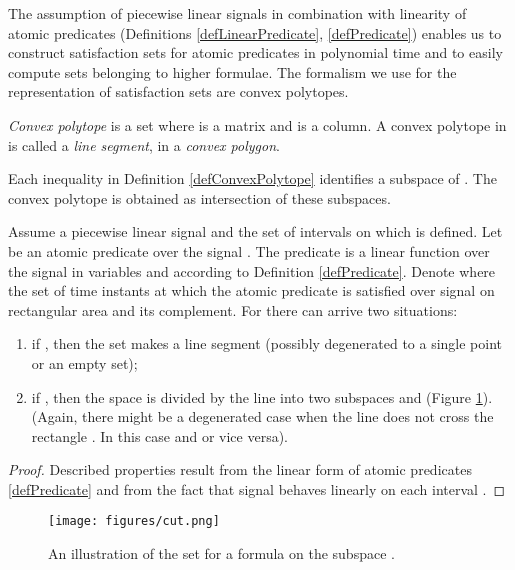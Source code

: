 The assumption of piecewise linear signals in combination with linearity of atomic predicates (Definitions \ref{defLinearPredicate}, \ref{defPredicate}) enables us to construct satisfaction sets for atomic predicates in polynomial time and to easily compute sets belonging to higher formulae. The formalism we use for the representation of satisfaction sets are convex polytopes.

\begin{definition}
	\label{defConvexPolytope}
	\emph{Convex polytope}  is a set  where  is a matrix and  is a  column. A convex polytope in  is called a \emph{line segment}, in  a \emph{convex polygon}.
\end{definition}

Each inequality  in Definition \ref{defConvexPolytope} identifies a subspace of . The convex polytope is obtained as intersection of these subspaces.

\begin{theorem}
	\label{lemma}
	Assume  a piecewise linear signal and  the set of intervals on which  is defined. Let  be an atomic predicate over the signal . The predicate  is a linear function over the signal  in variables  and  according to Definition \ref{defPredicate}. Denote  where  the set of time instants at which the atomic predicate  is satisfied over signal  on rectangular area  and  its complement. For  there can arrive two situations:

\begin{enumerate}
	\item if , then the set  makes a line segment (possibly degenerated to a single point or an empty set); 
	\item if , then the space  is divided by the line  into two subspaces  and  (Figure \ref{figCut}). (Again, there might be a degenerated case when the line  does not cross the rectangle . In this case  and  or vice versa).
\end{enumerate}

\begin{proof}
		Described properties result from the linear form of atomic predicates \ref{defPredicate} and from the fact that signal  behaves linearly on each interval .
	\end{proof}

\end{theorem}

\begin{figure}[h]
\vspace*{-3mm}
	\begin{center}
    \texttt{[image: figures/cut.png]}
     \caption{An illustration of the set  for a formula  on the subspace .}
    \label{figCut}
    \end{center}
\vspace*{-3mm}
\end{figure}


